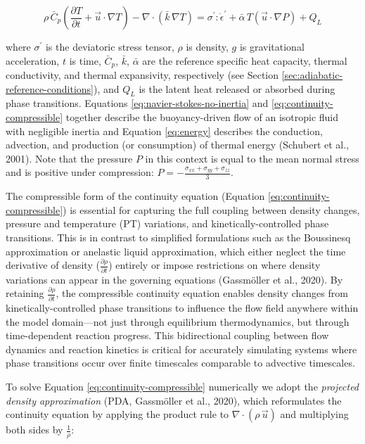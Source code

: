 \documentclass[draft,linenumbers]{agujournal2019}
\begin{document}
\begin{equation}
  \rho\, \bar{C}_p \left(\frac{\partial T}{\partial t} + \vec{u} \cdot \nabla T \right) - \nabla \cdot \left(\bar{k}\, \nabla T \right) = \sigma^{\prime} : \dot{\epsilon}^{\prime} + \bar{\alpha}\, T \left(\vec{u} \cdot \nabla P \right) + Q_L
  \label{eq:energy}
\end{equation}

where \(\sigma^{\prime}\) is the deviatoric stress tensor, \(\rho\) is
density, \(g\) is gravitational acceleration, \(t\) is time,
\(\bar{C}_p\), \(\bar{k}\), \(\bar{\alpha}\) are the reference specific
heat capacity, thermal conductivity, and thermal expansivity,
respectively (see Section \ref{sec:adiabatic-reference-conditions}), and
\(Q_L\) is the latent heat released or absorbed during phase
transitions. Equations \ref{eq:navier-stokes-no-inertia} and
\ref{eq:continuity-compressible} together describe the buoyancy-driven
flow of an isotropic fluid with negligible inertia and Equation
\ref{eq:energy} describes the conduction, advection, and production (or
consumption) of thermal energy (Schubert et al., 2001). Note that the
pressure \(P\) in this context is equal to the mean normal stress and is
positive under compression:
\(P = - \frac{\sigma_{xx} + \sigma_{yy} + \sigma_{zz}}{3}\).

The compressible form of the continuity equation (Equation
\ref{eq:continuity-compressible}) is essential for capturing the full
coupling between density changes, pressure and temperature (PT)
variations, and kinetically-controlled phase transitions. This is in
contrast to simplified formulations such as the Boussinesq approximation
or anelastic liquid approximation, which either neglect the time
derivative of density (\(\frac{\partial \rho}{\partial t}\)) entirely or
impose restrictions on where density variations can appear in the
governing equations (Gassmöller et al., 2020). By retaining
\(\frac{\partial \rho}{\partial t}\), the compressible continuity
equation enables density changes from kinetically-controlled phase
transitions to influence the flow field anywhere within the model
domain---not just through equilibrium thermodynamics, but through
time-dependent reaction progress. This bidirectional coupling between
flow dynamics and reaction kinetics is critical for accurately
simulating systems where phase transitions occur over finite timescales
comparable to advective timescales.

To solve Equation \ref{eq:continuity-compressible} numerically we adopt
the \emph{projected density approximation} (PDA, Gassmöller et al.,
2020), which reformulates the continuity equation by applying the
product rule to \(\nabla \cdot (\rho\, \vec{u})\) and multiplying both
sides by \(\frac{1}{\rho}\):
\end{document}

